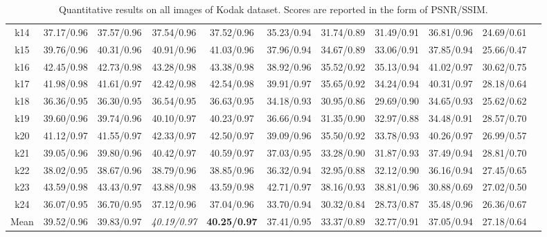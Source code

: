 \documentclass[letterpaper]{article} %
\begin{document}
\begin{table}[!ht]
{\begin{tabular}{ccccccccccc}
k14 & 37.17/0.96 & 37.57/0.96 & 37.54/0.96 & 37.52/0.96 & 35.23/0.94 & 31.74/0.89 & 31.49/0.91 & 36.81/0.96 & 24.69/0.61 \\
k15 & 39.76/0.96 & 40.31/0.96 & 40.91/0.96 & 41.03/0.96 & 37.96/0.94 & 34.67/0.89 & 33.06/0.91 & 37.85/0.94 & 25.66/0.47 \\
k16 & 42.45/0.98 & 42.73/0.98 & 43.28/0.98 & 43.38/0.98 & 38.92/0.96 & 35.52/0.92 & 35.13/0.94 & 41.02/0.97 & 30.62/0.75 \\
k17 & 41.98/0.98 & 41.61/0.97 & 42.42/0.98 & 42.54/0.98 & 39.91/0.97 & 35.65/0.92 & 34.24/0.94 & 40.31/0.97 & 28.18/0.64 \\
k18 & 36.36/0.95 & 36.30/0.95 & 36.54/0.95 & 36.63/0.95 & 34.18/0.93 & 30.95/0.86 & 29.69/0.90 & 34.65/0.93 & 25.62/0.62 \\
k19 & 39.60/0.96 & 39.74/0.96 & 40.10/0.97 & 40.23/0.97 & 36.66/0.94 & 31.35/0.90 & 32.97/0.88 & 34.48/0.91 & 28.57/0.70 \\
k20 & 41.12/0.97 & 41.55/0.97 & 42.33/0.97 & 42.50/0.97 & 39.09/0.96 & 35.50/0.92 & 33.78/0.93 & 40.26/0.97 & 26.99/0.57 \\
k21 & 39.05/0.96 & 39.80/0.96 & 40.42/0.97 & 40.59/0.97 & 37.03/0.95 & 33.28/0.90 & 31.87/0.93 & 37.49/0.94 & 28.81/0.70 \\
k22 & 38.02/0.95 & 38.67/0.96 & 38.79/0.96 & 38.85/0.96 & 36.32/0.94 & 32.95/0.88 & 32.12/0.90 & 36.16/0.94 & 27.45/0.65 \\
k23 & 43.59/0.98 & 43.43/0.97 & 43.88/0.98 & 43.59/0.98 & 42.71/0.97 & 38.16/0.93 & 38.81/0.96 & 30.88/0.69 & 27.02/0.50 \\
k24 & 36.07/0.95 & 36.70/0.95 & 37.12/0.96 & 37.04/0.96 & 33.70/0.94 & 30.32/0.84 & 28.73/0.87 & 35.48/0.96 & 26.36/0.67 \\
\midrule
Mean & 39.52/0.96 & 39.83/0.97 & \textit{40.19/0.97} & \textbf{40.25/0.97} & 37.41/0.95 & 33.37/0.89 & 32.77/0.91 & 37.05/0.94 & 27.18/0.64\\
\bottomrule
\end{tabular}%
}
\caption{Quantitative results on all images of Kodak dataset. Scores are reported in the form of PSNR/SSIM.}
\label{tab:all_kodak_results}
\end{table}
\end{document}
